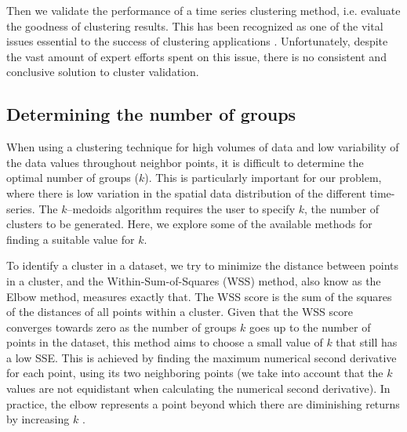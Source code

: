 Then we validate the performance of a time series clustering method, i.e. evaluate the goodness of clustering results. This has been recognized as one of the vital issues essential to the success of clustering applications \cite{Aggarwal2013}. Unfortunately, despite the vast amount of expert efforts spent on this issue, there is no consistent and conclusive solution to cluster validation. 

\subsection{Determining the number of groups}
\label{sub:domain_number_groups}

When using a clustering technique for high volumes of data and low variability of the data values throughout neighbor points, it is difficult to determine the optimal number of groups ($k$). This is particularly important for our problem, where there is low variation in the spatial data distribution of the different time-series. The $k$--medoids algorithm requires the user to specify $k$, the number of clusters to be generated. Here, we explore some of the available methods for finding a suitable value for $k$.

To identify a cluster in a dataset, we try to minimize the distance between points in a cluster, and the Within-Sum-of-Squares (WSS) method, also know as the Elbow method, measures exactly that. The WSS score is the sum of the squares of the distances of all points within a cluster. Given that the WSS score converges towards zero as the number of groups $k$ goes up to the number of points in the dataset, this method aims to choose a small value of $k$ that still has a low SSE. This is achieved by finding the maximum numerical second derivative for each point, using its two neighboring points (we take into account that the $k$ values are not equidistant when calculating the numerical second derivative). In practice, the elbow represents a point beyond which there are diminishing returns by increasing $k$ \cite{Han2011}.

